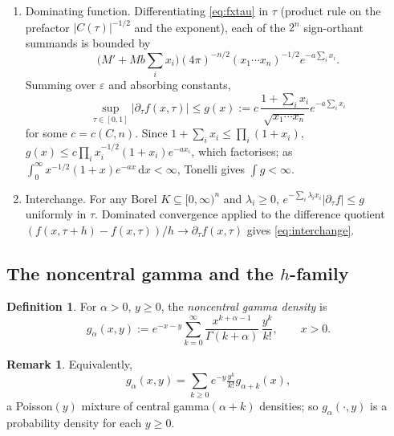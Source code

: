 \documentclass[14pt]{extarticle}
\makeatletter
\theoremstyle{definition}
\newtheorem{definition}[theorem]{Definition}
\newtheorem{remark}[theorem]{Remark}
\renewenvironment{proof}[1][\proofname]{\par
  \pushQED{\qed}%
  \normalfont \topsep6\p@\@plus6\p@\relax
  \trivlist
  \item[\hskip\labelsep\bfseries #1\@addpunct{.}]\ignorespaces
}{%
  \popQED\endtrivlist\@endpefalse
}
\newcommand{\dd}{\mathrm{d}}
\makeatother
\begin{document}
\begin{proof}
\begin{enumerate}[label=(\roman*)]
\begin{enumerate}
        \item Dominating function.  Differentiating \eqref{eq:fxtau}
          in $\tau$ (product rule on the prefactor $|C(\tau)|^{-1/2}$
          and the exponent), each of the $2^n$ sign-orthant summands
          is bounded by
          \[
            \bigl(M'+Mb\textstyle\sum_ix_i\bigr)
            (4\pi)^{-n/2}(x_1\cdots x_n)^{-1/2}e^{-a\sum_ix_i}.
          \]
          Summing over $\varepsilon$ and absorbing constants,
          \[
            \sup_{\tau\in[0,1]}|\partial_\tau f(x,\tau)|
            \leqslant g(x):=c\,\frac{1+\sum_ix_i}{\sqrt{x_1\cdots x_n}}
            e^{-a\sum_ix_i}
          \]
          for some $c=c(C,n)$.  Since $1+\sum_ix_i\leqslant\prod_i(1+x_i)$,
          $g(x)\leqslant c\prod_i x_i^{-1/2}(1+x_i)e^{-ax_i}$, which
          factorises; as $\int_0^\infty x^{-1/2}(1+x)e^{-ax}\,\dd x<\infty$,
          Tonelli gives $\int g<\infty$.

        \item Interchange.  For any Borel $K\subseteq[0,\infty)^n$ and
          $\lambda_i\geqslant 0$,
          $e^{-\sum_i\lambda_ix_i}|\partial_\tau f|\leqslant g$
          uniformly in $\tau$.  Dominated convergence applied to the
          difference quotient
          $(f(x,\tau+h)-f(x,\tau))/h\to\partial_\tau f(x,\tau)$ gives
          \eqref{eq:interchange}.
      \end{enumerate}
  \end{enumerate}
\end{proof}


\subsection{The noncentral gamma and the $h$-family}

\begin{definition}\label{def:ncgamma}
  For $\alpha>0$, $y\geqslant 0$, the \emph{noncentral gamma density} is
  \[
    g_\alpha(x,y)
    :=e^{-x-y}\sum_{k=0}^\infty
    \frac{x^{k+\alpha-1}}{\Gamma(k+\alpha)}\,\frac{y^k}{k!},
    \qquad x>0.
  \]
\end{definition}

\begin{remark}\label{rem:ncgamma_poisson}
  Equivalently,
  \[
    g_\alpha(x,y)=\sum_{k\geqslant 0}e^{-y}\tfrac{y^k}{k!}g_{\alpha+k}(x),
  \]
  a Poisson$(y)$ mixture of central gamma$(\alpha+k)$ densities; so
  $g_\alpha(\cdot,y)$ is a probability density for each $y\geqslant 0$.
\end{remark}
\end{document}
